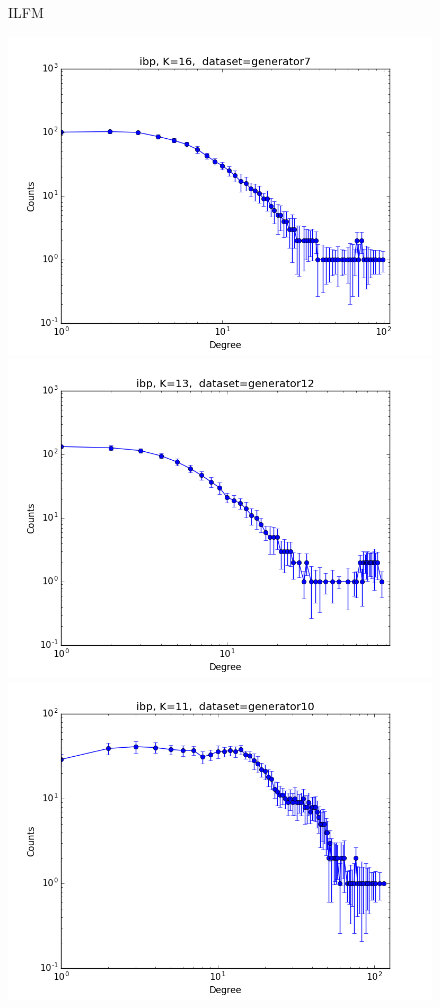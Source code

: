 \begin{figure}[ht]
    \vspace{0.2cm}
	 ILFM

	\includegraphics[scale=0.27]{img/expe/1_ibp/figure_1}
	\endminipage
	\includegraphics[scale=0.27]{img/expe/2_ibp/figure_1}
	\endminipage
	\includegraphics[scale=0.27]{img/expe/3_ibp/figure_1}

\end{figure}
